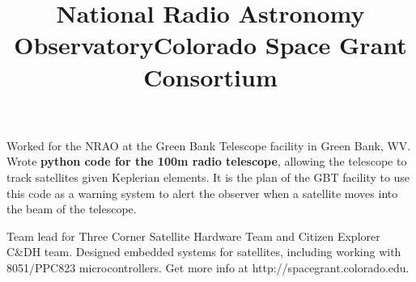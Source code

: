 \begin{resume}
\title{\bf National Radio Astronomy Observatory}
\begin{position}
Worked for the NRAO at the Green Bank Telescope facility in Green Bank, WV. Wrote {\bf python code for the 100m radio telescope}, allowing the telescope to track satellites given Keplerian elements. It is the plan of the GBT facility to use this code as a warning system to alert the observer when a satellite moves into the beam of the telescope. 
\end{position}


\title{\bf Colorado Space Grant Consortium}
\begin{position}
Team lead for Three Corner Satellite Hardware Team and Citizen Explorer C\&DH
team. Designed embedded systems for satellites, including working with 8051/PPC823 microcontrollers. Get more info at http://spacegrant.colorado.edu.
\end{position}




\end{resume}
